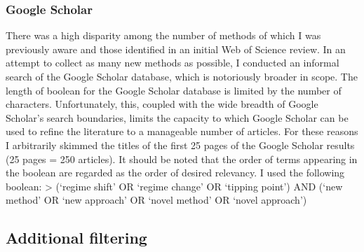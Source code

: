 \documentclass[12pt,twoside,openany]{reedthesis}
\begin{document}
\subsubsection{Google Scholar}\label{google-scholar}

There was a high disparity among the number of methods of which I was
previously aware and those identified in an initial Web of Science
review. In an attempt to collect as many new methods as possible, I
conducted an informal search of the Google Scholar database, which is
notoriously broader in scope. The length of boolean for the Google
Scholar database is limited by the number of characters. Unfortunately,
this, coupled with the wide breadth of Google Scholar's search
boundaries, limits the capacity to which Google Scholar can be used to
refine the literature to a manageable number of articles. For these
reasons I arbitrarily skimmed the titles of the first 25 pages of the
Google Scholar results (25 pages = 250 articles). It should be noted
that the order of terms appearing in the boolean are regarded as the
order of desired relevancy. I used the following boolean: \textgreater{}
(`regime shift' OR `regime change' OR `tipping point') AND (`new method'
OR `new approach' OR `novel method' OR `novel approach')

\subsection{Additional filtering}\label{additional-filtering}
\end{document}
